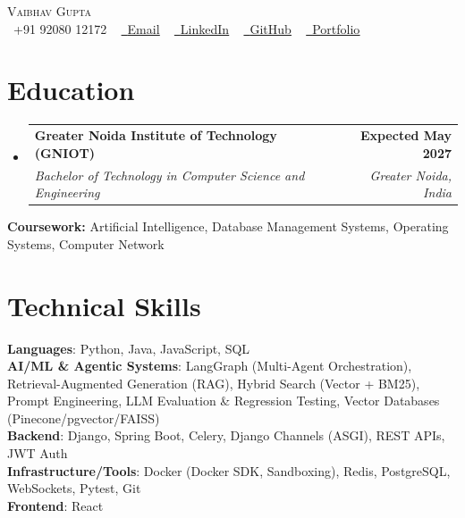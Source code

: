 \documentclass[letterpaper,10pt]{article}
\makeatletter
\newcommand{\resumeSubheading}[4]{
  \vspace{-2pt}\item
    \begin{tabular*}{1.0\textwidth}[t]{l@{\extracolsep{\fill}}r}
      \textbf{#1} & \textbf{\small #2} \\
      \textit{\small#3} & \textit{\small #4} \\
    \end{tabular*}\vspace{-7pt}
}
\newcommand{\resumeSubHeadingListStart}{\begin{itemize}[leftmargin=0.0in, label={}]}
\newcommand{\resumeSubHeadingListEnd}{\end{itemize}}
\makeatother
\begin{document}

\begin{center}
    {\Huge \scshape Vaibhav Gupta} \\ \vspace{1pt}
    \small \raisebox{-0.1\height}\faPhone\ +91 92080 12172 ~
    \href{mailto:vaibhv19.business@gmail.com}{\raisebox{-0.2\height}\faEnvelope\ \underline{Email}} ~
    \href{https://linkedin.com/in/vaibhv19}{\raisebox{-0.2\height}\faLinkedin\ \underline{LinkedIn}} ~
    \href{https://github.com/vaibhv19}{\raisebox{-0.2\height}\faGithub\ \underline{GitHub}} ~
    \href{https://vaibhv19.dev}{\raisebox{-0.2\height}\faGlobe\ \underline{Portfolio}}
    \vspace{-8pt}
\end{center}

\section{Education}
  \resumeSubHeadingListStart
    \resumeSubheading
      {Greater Noida Institute of Technology (GNIOT)}{Expected May 2027}
      {Bachelor of Technology in Computer Science and Engineering}{Greater Noida, India}
  \resumeSubHeadingListEnd
  \vspace{-4pt}
  \begin{itemize}[leftmargin=0in, label={}]
    \small{\item{\textbf{Coursework:} Artificial Intelligence, Database Management Systems, Operating Systems, Computer Network}}
    \vspace{-10pt}
\end{itemize} 

\section{Technical Skills}
 \begin{itemize}[leftmargin=0in, label={}]
    \small{\item{
     \textbf{Languages}{: Python, Java, JavaScript, SQL} \\
     \textbf{AI/ML \& Agentic Systems}{: LangGraph (Multi-Agent Orchestration), Retrieval-Augmented Generation (RAG), Hybrid Search (Vector + BM25), Prompt Engineering, LLM Evaluation \& Regression Testing, Vector Databases (Pinecone/pgvector/FAISS)} \\
     \textbf{Backend}{: Django, Spring Boot, Celery, Django Channels (ASGI), REST APIs, JWT Auth} \\
     \textbf{Infrastructure/Tools}{: Docker (Docker SDK, Sandboxing), Redis, PostgreSQL, WebSockets, Pytest, Git} \\
     \textbf{Frontend}{: React} \\
    }}
 \end{itemize}
 \vspace{-12pt}
 
\end{document}
